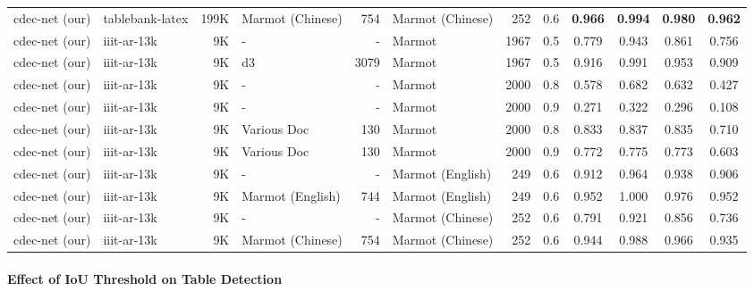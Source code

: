 \documentclass[a4paper,conference]{IEEEtran}
\begin{document}
\begin{table*}[ht!]
\begin{center}
\begin{tabular}{|l| l | r|l |r|l|r| c| c c c c|}
{\sc cd}e{\sc c-n}et (our) &{\sc t}able{\sc b}ank-{\sc l}a{\sc t}e{\sc x} &199K &Marmot (Chinese) &754 &Marmot (Chinese) &252 &0.6 &\textbf{0.966} &\textbf{0.994} &\textbf{0.980} &\textbf{0.962} \\ \hhline{|=|=|=|=|=|=|=|=|====|}
{\sc cd}e{\sc c-n}et (our) &{\sc iiit-ar-13k} &9K &- &- &Marmot &1967 &0.5 &0.779 &0.943 &0.861 &0.756 \\
{\sc cd}e{\sc c-n}et (our) &{\sc iiit-ar-13k} &9K &{\sc d3} &3079 &Marmot &1967 &0.5 &0.916 &0.991 &0.953 &0.909 \\ 
{\sc cd}e{\sc c-n}et (our) &{\sc iiit-ar-13k} &9K &- &- &Marmot &2000 &0.8 &0.578 &0.682 &0.632 &0.427 \\ 
{\sc cd}e{\sc c-n}et (our) &{\sc iiit-ar-13k} &9K &- &- &Marmot &2000 &0.9 &0.271 &0.322 &0.296 &0.108 \\ 
{\sc cd}e{\sc c-n}et (our) &{\sc iiit-ar-13k} &9K &Various Doc &130 &Marmot &2000 &0.8 &0.833 &0.837 &0.835 &0.710 \\ 
{\sc cd}e{\sc c-n}et (our) &{\sc iiit-ar-13k} &9K &Various Doc &130 &Marmot &2000 &0.9 &0.772 &0.775 &0.773 &0.603 \\
{\sc cd}e{\sc c-n}et (our) &{\sc iiit-ar-13k} &9K &- &- &Marmot (English) &249 &0.6 &0.912 &0.964 &0.938 &0.906 \\
{\sc cd}e{\sc c-n}et (our) &{\sc iiit-ar-13k} &9K &Marmot (English) &744 &Marmot (English) &249 &0.6 &0.952 &1.000 &0.976 &0.952 \\
{\sc cd}e{\sc c-n}et (our) &{\sc iiit-ar-13k} &9K &- &- &Marmot (Chinese) &252 &0.6 &0.791 &0.921 &0.856 &0.736 \\
{\sc cd}e{\sc c-n}et (our) &{\sc iiit-ar-13k} &9K &Marmot (Chinese) &754 &Marmot (Chinese) &252 &0.6 &0.944 &0.988 &0.966 &0.935 \\ \hline
\end{tabular}
\end{center}
\caption{Illustrates comparison between the proposed {\sc cd}e{\sc c-n}et and state-of-the-art techniques on {\sc m}armot dataset. {\sc \textbf{d3:}} indicates {\sc icdar-2013}+{\sc icdar-2017}+{\sc unlv}. {\sc cd}e{\sc c-n}et\textbf{:} indicates a single  model which is trained with {\sc iiit-ar-13k} dataset. \label{table_marmot_arxiv}}
\end{table*}

\paragraph*{\textbf{Effect of IoU Threshold on Table Detection}}
\end{document}
